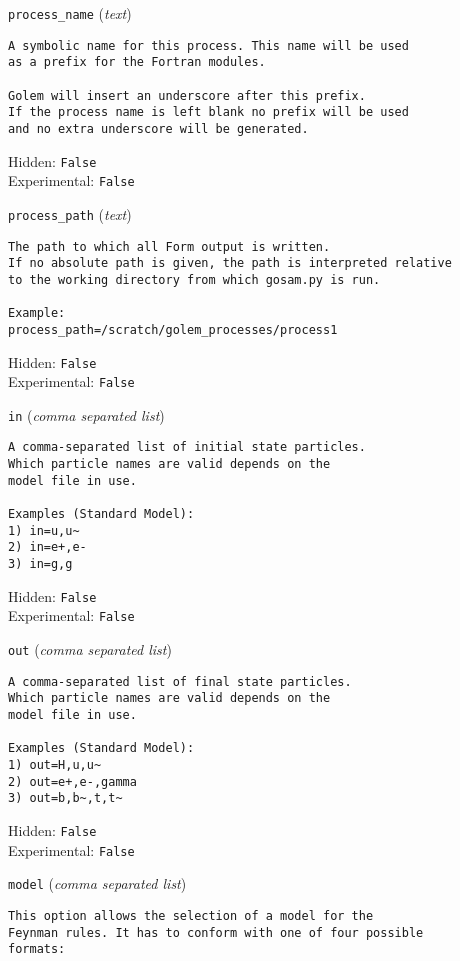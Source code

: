 \begin{basedescript}{\desclabelstyle{\pushlabel}}
\setlength\itemsep{30pt}
\item[\colorbox{gray!30}{\texttt{process\_name}}] (\textit{text})
\begin{verbatim}
A symbolic name for this process. This name will be used
as a prefix for the Fortran modules.

Golem will insert an underscore after this prefix.
If the process name is left blank no prefix will be used
and no extra underscore will be generated.
\end{verbatim}
Hidden: \verb|False|
\\Experimental: \verb|False|
\\\item[\colorbox{gray!30}{\texttt{process\_path}}] (\textit{text})
\begin{verbatim}
The path to which all Form output is written.
If no absolute path is given, the path is interpreted relative
to the working directory from which gosam.py is run.

Example:
process_path=/scratch/golem_processes/process1
\end{verbatim}
Hidden: \verb|False|
\\Experimental: \verb|False|
\\\item[\colorbox{gray!30}{\texttt{in}}] (\textit{comma separated list})
\begin{verbatim}
A comma-separated list of initial state particles.
Which particle names are valid depends on the
model file in use.

Examples (Standard Model):
1) in=u,u~
2) in=e+,e-
3) in=g,g
\end{verbatim}
Hidden: \verb|False|
\\Experimental: \verb|False|
\\\item[\colorbox{gray!30}{\texttt{out}}] (\textit{comma separated list})
\begin{verbatim}
A comma-separated list of final state particles.
Which particle names are valid depends on the
model file in use.

Examples (Standard Model):
1) out=H,u,u~
2) out=e+,e-,gamma
3) out=b,b~,t,t~
\end{verbatim}
Hidden: \verb|False|
\\Experimental: \verb|False|
\\\item[\colorbox{gray!30}{\texttt{model}}] (\textit{comma separated list})
\begin{verbatim}
This option allows the selection of a model for the
Feynman rules. It has to conform with one of four possible
formats:


\end{verbatim}
\end{basedescript}
